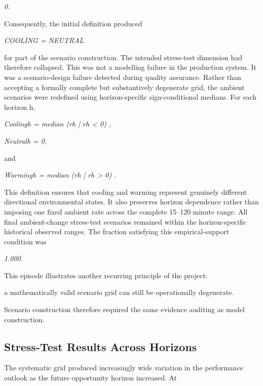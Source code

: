 \begin{center}\textit{0.}\end{center}

Consequently, the initial definition produced

\begin{center}\textit{COOLING = NEUTRAL}\end{center}

for part of the scenario construction. The intended stress-test dimension had therefore collapsed. This was not a modelling failure in the production system. It was a scenario-design failure detected during quality assurance. Rather than accepting a formally complete but substantively degenerate grid, the ambient scenarios were redefined using horizon-specific sign-conditional medians. For each horizon h,

\begin{center}\textit{Coolingh = median (rh | rh < 0) ,}\end{center}

\begin{center}\textit{Neutralh = 0,}\end{center}

and

\begin{center}\textit{Warmingh = median (rh | rh > 0) .}\end{center}

This definition ensures that cooling and warming represent genuinely different directional environmental states. It also preserves horizon dependence rather than imposing one fixed ambient rate across the complete 15--120 minute range. All final ambient-change stress-test scenarios remained within the horizon-specific historical observed ranges. The fraction satisfying this empirical-support condition was

\begin{center}\textit{1.000.}\end{center}

This episode illustrates another recurring principle of the project:

a mathematically valid scenario grid can still be operationally degenerate.

Scenario construction therefore required the same evidence auditing as model construction.

\subsection{Stress-Test Results Across Horizons}
The systematic grid produced increasingly wide variation in the performance outlook as the future opportunity horizon increased. At


